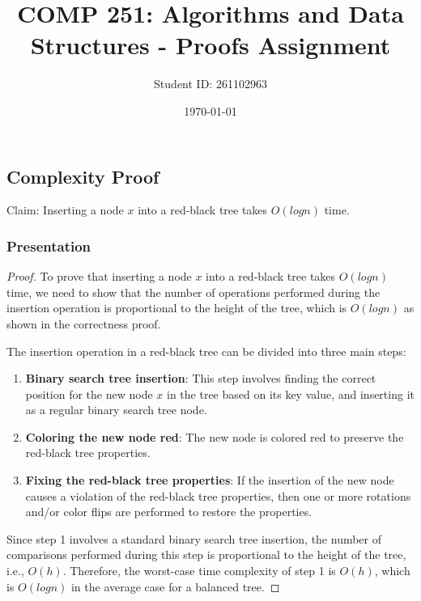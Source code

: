 \documentclass[10pt]{article}
\title{COMP
251:
Algorithms
and
Data
Structures
-
Proofs
Assignment}
\author{Student ID: 261102963}\\
\date{\today}
\begin{document}
  \maketitle


  \subsection*{Complexity Proof}


  Claim: Inserting a node $x$ into a red-black tree takes $O(log n)$ time.

  \subsubsection*{Presentation}


  \begin{proof}
    To prove that inserting a node $x$ into a red-black tree takes $O(log n)$ time,
    we need to show that the number of operations performed during the insertion
    operation is proportional to the height of the tree, which is $O(logn)$ as shown
    in the correctness proof.

    \spacing
    \noindent
    The insertion operation in a red-black tree can be divided into three main steps:

    \begin{enumerate}
      \item \textbf{Binary search tree insertion}: This step involves finding the
        correct position for the new node $x$ in the tree based on its key value,
        and inserting it as a regular binary search tree node.

      \item \textbf{Coloring the new node red}: The new node is colored red to preserve
        the red-black tree properties.

      \item \textbf{Fixing the red-black tree properties}: If the insertion of the
        new node causes a violation of the red-black tree properties, then one
        or more rotations and/or color flips are performed to restore the
        properties.
    \end{enumerate}

    \noindent
    Since step 1 involves a standard binary search tree insertion, the number of
    comparisons performed during this step is proportional to the height of the tree,
    i.e., $O(h)$. Therefore, the worst-case time complexity of step 1 is $O(h)$,
    which is $O(logn)$ in the average case for a balanced tree.


\end{proof}
\end{document}

